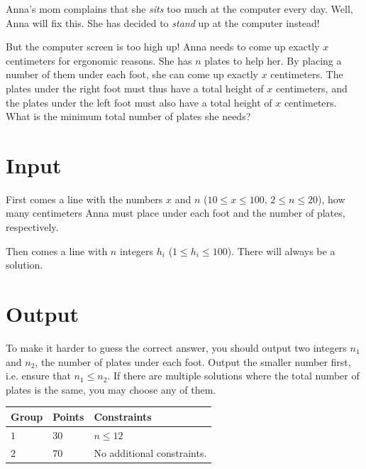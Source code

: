 Anna's mom complains that she \emph{sits} too much at the computer every
day. Well, Anna will fix this. She has decided to
\emph{stand} up at the computer instead!

But the computer screen is too high up! Anna needs to come up exactly
$x$ centimeters for ergonomic reasons. She has $n$ plates to help her. By placing
a number of them under each foot, she can come up exactly $x$ centimeters.
The plates under the right foot must thus have a total height of $x$ centimeters, and the plates under the left foot must
also have a total height of $x$ centimeters. What is the minimum total number of plates she needs?

\section*{Input}

First comes a line with the numbers $x$ and $n$ ($10 \leq x \leq 100$, $2 \leq n \leq
20$), how many centimeters Anna must place under each foot and
the number of plates, respectively.

Then comes a line with $n$ integers $h_i$ ($1 \leq h_i \leq 100$). There will always be
a solution.

\section*{Output}
To make it harder to guess the correct answer, you should output two integers $n_1$ and $n_2$,
the number of plates under each foot. Output the smaller number first, i.e. ensure that $n_1\leq n_2$.
If there are multiple solutions where the total number of plates is the same, you may choose any of them.

\noindent
\begin{tabular}{| l | l | p{12cm} |}
  \hline
  \textbf{Group} & \textbf{Points} & \textbf{Constraints} \\ \hline
  $1$    & $30$        & $n \leq 12$ \\ \hline 
  $2$    & $70$        & No additional constraints. \\ \hline 
\end{tabular}
